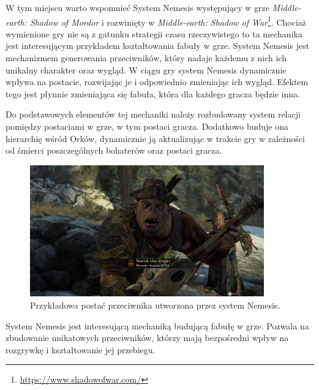 W tym miejscu warto wspomnieć System Nemesis występujący w grze \textit{Middle-earth: Shadow of Mordor} i rozwinięty w
\textit{Middle-earth: Shadow of War}\footnote{\url{https://www.shadowofwar.com/}}. Chociaż wymienione gry nie są z gatunku strategii czasu rzeczywistego to ta mechanika jest
interesującym przykładem kształtowania fabuły w grze. System Nemesis jest mechanizmem generowania przeciwników, który nadaje
każdemu z nich ich unikalny charakter oraz wygląd. W ciągu gry system Nemesis dynamicznie wpływa na postacie, rozwijając
je i odpowiednio zmieniając ich wygląd. Efektem tego jest płynnie zmieniająca się fabuła, która dla każdego gracza
będzie inna.

Do podstawowych elementów tej mechaniki należy rozbudowany system relacji pomiędzy postaciami w grze, w tym postaci
gracza. Dodatkowo buduje ona hierarchię wśród Orków, dynamicznie ją aktualizując w trakcie gry w zależności od śmierci
poszczególnych bohaterów oraz postaci gracza.

\begin{figure}[h!]
    \centering
    \includegraphics[width=0.9\textwidth]{images/system_nemesis.jpg}
    \caption{Przykładowa postać przeciwnika utworzona przez system Nemesis.}
\end{figure}

System Nemesis jest interesującą mechaniką budującą fabułę w grze. Pozwala na zbudowanie unikatowych przeciwników,
którzy mają bezpośredni wpływ na rozgrywkę i kształtowanie jej przebiegu.